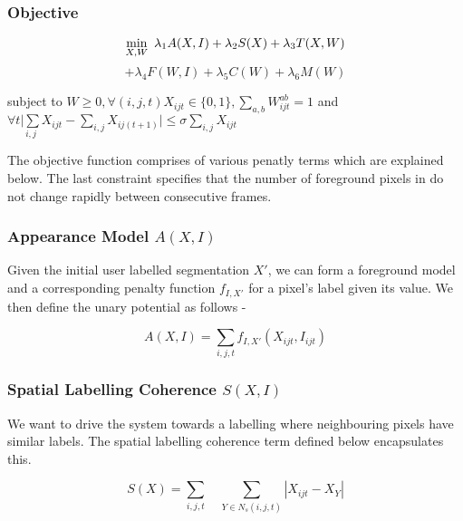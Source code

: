 \documentclass{article}
\begin{document}
\subsubsection*{Objective}

\begin{equation}
\underset{X,W}{\min}\enskip\lambda_{1}A(X,I)+\lambda_{2}S(X)+\lambda_{3}T(X,W)
\end{equation}
\[
+\lambda_{4}F(W,I) +\lambda_{5}C(W)+\lambda_{6}M(W)
\]


\begin{center}
subject to $W\geq0,\forall(i,j,t)X_{ijt}\in\{0,1\},\underset{a,b}{\sum}W_{ijt}^{ab}=1$
and $\forall t\underset{i,j}{|\sum}X_{ijt}-\underset{i,j}{\sum}X_{ij(t+1)}|\leq\sigma\underset{i,j}{\sum}X_{ijt}$
\par\end{center}

\noindent The objective function comprises of various penatly terms
which are explained below. The last constraint specifies that the
number of foreground pixels in do not change rapidly between consecutive
frames.


\subsubsection*{Appearance Model $A(X,I)$}

Given the initial user labelled segmentation $X'$, we can form a
foreground model and a corresponding penalty function $f_{I,X'}$
for a pixel's label given its value. We then define the unary potential
as follows -

\begin{equation}
A(X,I)=\underset{i,j,t}{\sum}f_{I,X'}(X_{ijt},I_{ijt})
\end{equation}



\subsubsection*{Spatial Labelling Coherence $S(X,I)$}

We want to drive the system towards a labelling where neighbouring
pixels have similar labels. The spatial labelling coherence term defined
below encapsulates this.

\begin{equation}
S(X)=\underset{i,j,t}{\sum}\quad\underset{Y\in N_{s}(i,j,t)}{\sum}|X_{ijt}-X_{Y}|
\end{equation}
\end{document}
